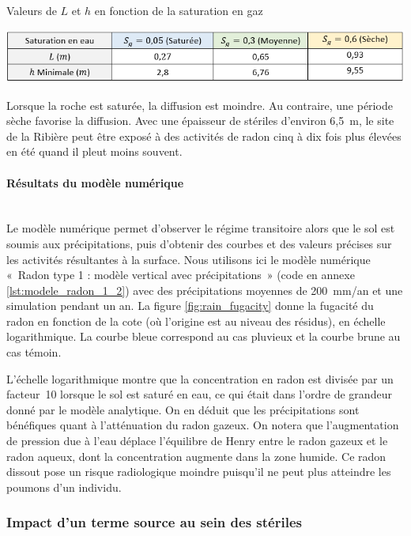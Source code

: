 \documentclass{article}
\begin{document}
\begin{table}[H]
    \centering
    \caption{Valeurs de $L$ et $h$ en fonction de la saturation en gaz}
    \includegraphics[width = \linewidth]{III_C_4.png}
    \label{tab:tableau_saturation}
\end{table}

Lorsque la roche est saturée, la diffusion est moindre. Au contraire, une période sèche favorise la diffusion. Avec une épaisseur de stériles d'environ 6,5~m, le site de la Ribière peut être exposé à des activités de radon cinq à dix fois plus élevées en été quand il pleut moins souvent.

\paragraph{Résultats du modèle numérique \\ \\} Le modèle numérique permet d’observer le régime transitoire alors que le sol est soumis aux précipitations, puis d'obtenir des courbes et des valeurs précises sur les activités résultantes à la surface. Nous utilisons ici le modèle numérique «~Radon type 1 : modèle vertical avec précipitations~» (code en annexe \ref{lst:modele_radon_1_2}) avec des précipitations moyennes de 200~mm/an et une simulation pendant un an. La figure \ref{fig:rain_fugacity} donne la fugacité du radon en fonction de la cote (où l'origine est au niveau des résidus), en échelle logarithmique. La courbe bleue correspond au cas pluvieux et la courbe brune au cas témoin.

L’échelle logarithmique montre que la concentration en radon est divisée par un facteur~10 lorsque le sol est saturé en eau, ce qui était dans l'ordre de grandeur donné par le modèle analytique. On en déduit que les précipitations sont bénéfiques quant à l’atténuation du radon gazeux. On notera que l'augmentation de pression due à l'eau déplace l’équilibre de Henry entre le radon gazeux et le radon aqueux, dont la concentration augmente dans la zone humide. Ce radon dissout pose un risque radiologique moindre puisqu'il ne peut plus atteindre les poumons d'un individu.

\newpage
\subsubsection{Impact d'un terme source au sein des stériles}
\end{document}
